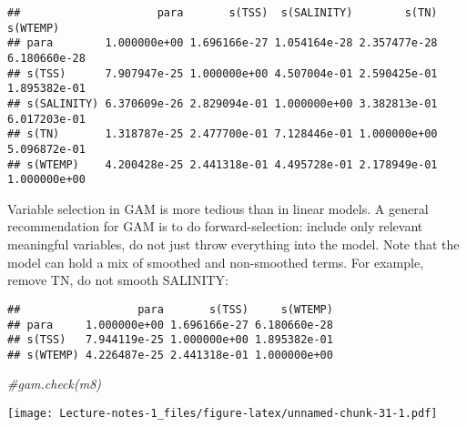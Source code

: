 \documentclass[
]{book}
\newenvironment{Shaded}{\begin{snugshade}}{\end{snugshade}}
\newcommand{\CommentTok}[1]{\textcolor[rgb]{0.56,0.35,0.01}{\textit{#1}}}
\newcommand{\DataTypeTok}[1]{\textcolor[rgb]{0.13,0.29,0.53}{#1}}
\newcommand{\DecValTok}[1]{\textcolor[rgb]{0.00,0.00,0.81}{#1}}
\newcommand{\KeywordTok}[1]{\textcolor[rgb]{0.13,0.29,0.53}{\textbf{#1}}}
\newcommand{\NormalTok}[1]{#1}
\newcommand{\OperatorTok}[1]{\textcolor[rgb]{0.81,0.36,0.00}{\textbf{#1}}}
\newcommand{\OtherTok}[1]{\textcolor[rgb]{0.56,0.35,0.01}{#1}}
\newcommand{\StringTok}[1]{\textcolor[rgb]{0.31,0.60,0.02}{#1}}
\begin{document}
\begin{Shaded}
\end{Shaded}

\begin{verbatim}
##                     para       s(TSS)  s(SALINITY)        s(TN)     s(WTEMP)
## para        1.000000e+00 1.696166e-27 1.054164e-28 2.357477e-28 6.180660e-28
## s(TSS)      7.907947e-25 1.000000e+00 4.507004e-01 2.590425e-01 1.895382e-01
## s(SALINITY) 6.370609e-26 2.829094e-01 1.000000e+00 3.382813e-01 6.017203e-01
## s(TN)       1.318787e-25 2.477700e-01 7.128446e-01 1.000000e+00 5.096872e-01
## s(WTEMP)    4.200428e-25 2.441318e-01 4.495728e-01 2.178949e-01 1.000000e+00
\end{verbatim}

Variable selection in GAM is more tedious than in linear models. A general recommendation for GAM is to do forward-selection: include only relevant meaningful variables, do not just throw everything into the model. Note that the model can hold a mix of smoothed and non-smoothed terms. For example, remove TN, do not smooth SALINITY:

\begin{Shaded}
\end{Shaded}

\begin{verbatim}
##                  para       s(TSS)     s(WTEMP)
## para     1.000000e+00 1.696166e-27 6.180660e-28
## s(TSS)   7.944119e-25 1.000000e+00 1.895382e-01
## s(WTEMP) 4.226487e-25 2.441318e-01 1.000000e+00
\end{verbatim}

\begin{Shaded}
\begin{Highlighting}[]
\CommentTok{#gam.check(m8)}
\end{Highlighting}
\end{Shaded}

\texttt{[image: Lecture-notes-1\_files/figure-latex/unnamed-chunk-31-1.pdf]}

  
\end{document}
